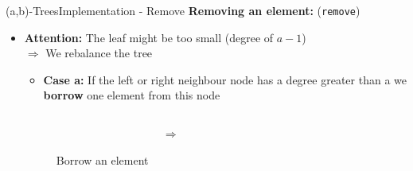 \begin{frame}{(a,b)-Trees}{Implementation - Remove}
  \textbf{Removing an element:} (\texttt{\color{MainA}remove})
  \begin{itemize}
    \item<2->
      \textbf{Attention:} The leaf might be too small
      (degree of {\color{MainA}$a-1$})\\
      $\Rightarrow$ We {\color{MainA}rebalance} the tree
      \vspace{0.5em}
      \begin{itemize}
        \item<3->
        \textbf{Case a:}
        If the left or right neighbour node has a degree
        {\color{MainA}greater than a} we \textbf{borrow} one element
        from this node
      \end{itemize}
      \begin{figure}
        \begin{columns}
          \begin{column}{0.45\linewidth}
            \begin{adjustbox}{width=\linewidth}
              
            \end{adjustbox}
          \end{column}
          \begin{column}{0.1\linewidth}
            \begin{center}
              $\Rightarrow$
            \end{center}
          \end{column}
          \begin{column}{0.45\linewidth}
            \begin{adjustbox}{width=\linewidth}
              
            \end{adjustbox}
          \end{column}
        \end{columns}
        \caption{Borrow an element}
        \label{fig:a_b_tree:move}
      \end{figure}
  \end{itemize}
\end{frame}


